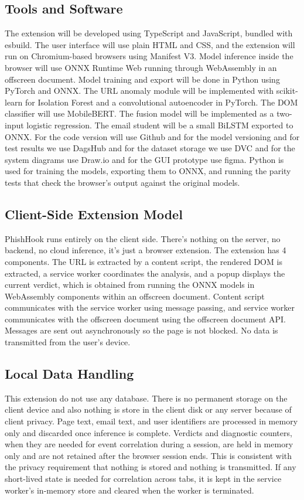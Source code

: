 \documentclass{FastFyp}
\begin{document}
\subsection{Tools and Software}
The extension will be developed using TypeScript and JavaScript, bundled with esbuild. The user interface will use plain HTML and CSS, and the extension will run on Chromium-based browsers using Manifest V3. Model inference inside the browser will use ONNX Runtime Web running through WebAssembly in an offscreen document. Model training and export will be done in Python using PyTorch and ONNX. The URL anomaly module will be implemented with scikit-learn for Isolation Forest and a convolutional autoencoder in PyTorch. The DOM classifier will use MobileBERT. The fusion model will be implemented as a two-input logistic regression. The email student will be a small BiLSTM exported to ONNX. For the code version will use Github and for the model versioning and for test results we use DagsHub and for the dataset storage we use DVC and for the system diagrams use Draw.io and for the GUI prototype use figma. Python is used for training the models, exporting them to ONNX, and running the parity tests that check the browser's output against the original models.

\subsection{Client-Side Extension Model}
PhishHook runs entirely on the client side. There's nothing on the server, no backend, no cloud inference, it's just a browser extension. The extension has 4 components. The URL is extracted by a content script, the rendered DOM is extracted, a service worker coordinates the analysis, and a popup displays the current verdict, which is obtained from running the ONNX models in WebAssembly components within an offscreen document. Content script communicates with the service worker using message passing, and service worker communicates with the offscreen document using the offscreen document API. Messages are sent out asynchronously so the page is not blocked. No data is transmitted from the user's device.

\subsection{Local Data Handling}
This extension do not use any database. There is no permanent storage on the client device and also nothing is store in the client disk or any server because of client privacy.  Page text, email text, and user identifiers are processed in memory only and discarded once inference is complete. Verdicts and diagnostic counters, when they are needed for event correlation during a session, are held in memory only and are not retained after the browser session ends. This is consistent with the privacy requirement that nothing is stored and nothing is transmitted. If any short-lived state is needed for correlation across tabs, it is kept in the service worker's in-memory store and cleared when the worker is terminated.
\end{document}
